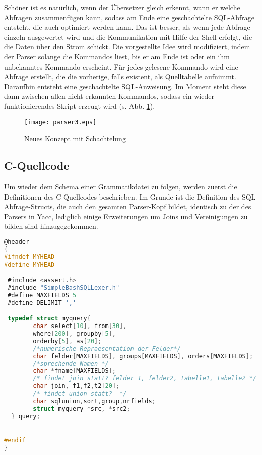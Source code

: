 Schöner ist es natürlich, wenn der Übersetzer gleich erkennt, wann er welche Abfragen zusammenfügen kann, sodass am Ende eine geschachtelte SQL-Abfrage entsteht, die auch optimiert werden kann. Das ist besser, als wenn jede Abfrage einzeln ausgewertet wird und die Kommunikation mit Hilfe der Shell erfolgt, die die Daten über den Strom schickt. Die vorgestellte Idee wird modifiziert, indem der Parser solange die Kommandos liest, bis er am Ende ist oder ein ihm unbekanntes Kommando erscheint. Für jedes gelesene Kommando wird eine Abfrage erstellt, die die vorherige, falls existent, als Quelltabelle aufnimmt. Daraufhin entsteht eine geschachtelte SQL-Anweisung. Im Moment steht diese dann zwischen allen nicht erkannten Kommandos, sodass ein wieder funktionierendes Skript erzeugt wird (s. Abb. \ref{fig:parser3}).

\begin{figure}[h]
\centering
\texttt{[image: parser3.eps]}
\caption{Neues Konzept mit Schachtelung}
\label{fig:parser3}
\end{figure}

\subsection{C-Quellcode}
Um wieder dem Schema einer Grammatikdatei zu folgen, werden zuerst die Definitionen des C-Quellcodes beschrieben.
Im Grunde ist die Definition des SQL-Abfrage-Structs, die auch den gesamten Parser-Kopf bildet, identisch zu der des Parsers in Yacc, lediglich einige Erweiterungen um Joins und Vereinigungen zu bilden sind hinzugegekommen.

\begin{lstlisting}[language=C]
@header
{
#ifndef MYHEAD
#define MYHEAD

 #include <assert.h>
 #include "SimpleBashSQLLexer.h"
 #define MAXFIELDS 5
 #define DELIMIT ','

 typedef struct myquery{
        char select[10], from[30],
        where[200], groupby[5],
        orderby[5], as[20];
        /*numerische Repraesentation der Felder*/
        char felder[MAXFIELDS], groups[MAXFIELDS], orders[MAXFIELDS];
        /*sprechende Namen */
        char *fname[MAXFIELDS];
        /* findet join statt? felder 1, felder2, tabelle1, tabelle2 */
        char join, f1,f2,t2[20];
        /* findet union statt?  */
        char sqlunion,sort,group,nrfields;
        struct myquery *src, *src2;
  } query;


#endif
}
\end{lstlisting}

